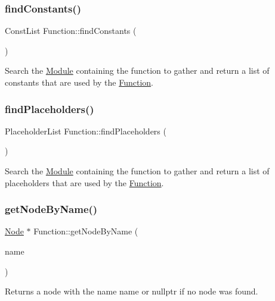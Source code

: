 \subsubsection{\texorpdfstring{find\+Constants()}{findConstants()}}
{\footnotesize\ttfamily Const\+List Function\+::find\+Constants (\begin{DoxyParamCaption}{ }\end{DoxyParamCaption})}

Search the \hyperlink{classglow_1_1_module}{Module} containing the function to gather and return a list of constants that are used by the \hyperlink{classglow_1_1_function}{Function}. \mbox{\label{classglow_1_1_function_abc73d2632bdeaaa7a2ec029196608ab7}} 
\subsubsection{\texorpdfstring{find\+Placeholders()}{findPlaceholders()}}
{\footnotesize\ttfamily Placeholder\+List Function\+::find\+Placeholders (\begin{DoxyParamCaption}{ }\end{DoxyParamCaption})}

Search the \hyperlink{classglow_1_1_module}{Module} containing the function to gather and return a list of placeholders that are used by the \hyperlink{classglow_1_1_function}{Function}. \mbox{\label{classglow_1_1_function_a26cfda31e823d1499173f1bd23f2d86c}} 
\subsubsection{\texorpdfstring{get\+Node\+By\+Name()}{getNodeByName()}}
{\footnotesize\ttfamily \hyperlink{classglow_1_1_node}{Node} $\ast$ Function\+::get\+Node\+By\+Name (\begin{DoxyParamCaption}\item[{llvm\+::\+String\+Ref}]{name }\end{DoxyParamCaption})}

\begin{DoxyReturn}{Returns}
a node with the name {\ttfamily name} or nullptr if no node was found. 
\end{DoxyReturn}
\mbox{\label{classglow_1_1_function_ad79bc51bcabb426b1f64e8a0700fba2d}} 
